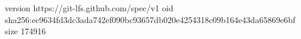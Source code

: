 version https://git-lfs.github.com/spec/v1
oid sha256:ec9634fd3dc3ada742ef090bc93657db020e4254318c09b164e43da65869e6bf
size 174916
